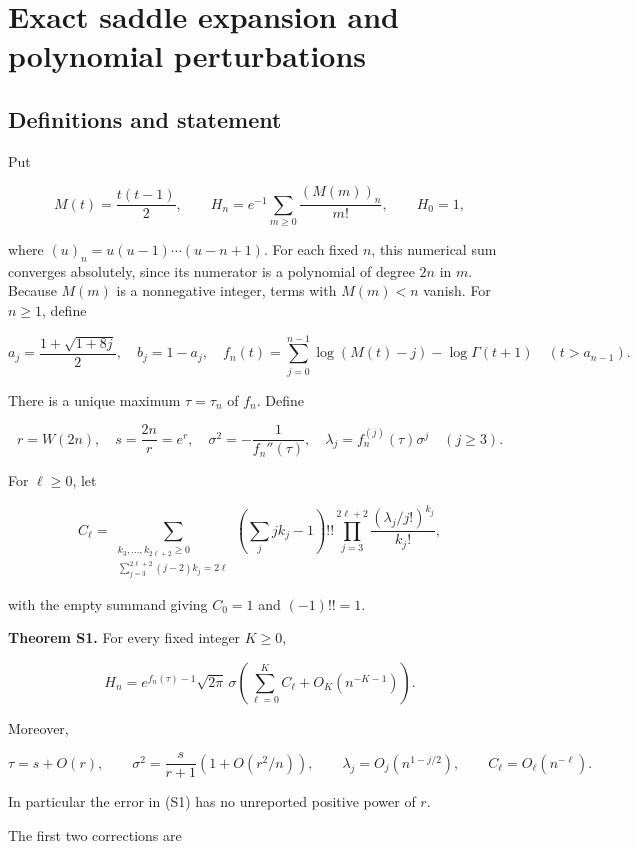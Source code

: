 \section{Exact saddle expansion and polynomial
perturbations}\label{tcl:exact-saddle-expansion-and-polynomial-perturbations}

\subsection{Definitions and statement}\label{tcl:definitions-and-statement}

Put

\[
 M(t)=\frac{t(t-1)}2,\qquad
 H_n=e^{-1}\sum_{m\ge0}\frac{(M(m))_n}{m!},\qquad H_0=1,
\]

where \((u)_n=u(u-1)\cdots(u-n+1)\). For each fixed \(n\), this
numerical sum converges absolutely, since its numerator is a polynomial
of degree \(2n\) in \(m\). Because \(M(m)\) is a nonnegative integer,
terms with \(M(m)<n\) vanish. For \(n\ge1\), define

\[
 a_j=\frac{1+\sqrt{1+8j}}2,\quad b_j=1-a_j,
 \quad f_n(t)=\sum_{j=0}^{n-1}\log(M(t)-j)-\log\Gamma(t+1)
 \quad(t>a_{n-1}).
\]

There is a unique maximum \(\tau=\tau_n\) of \(f_n\). Define

\[
 r=W(2n),\quad s=\frac{2n}{r}=e^r,\quad
 \sigma^2=-\frac1{f_n''(\tau)},\quad
 \lambda_j=f_n^{(j)}(\tau)\sigma^j\quad(j\ge3).
\]

For \(\ell\ge0\), let

\[
 C_\ell=\sum_{\substack{k_3,\ldots,k_{2\ell+2}\ge0\\
               \sum_{j=3}^{2\ell+2}(j-2)k_j=2\ell}}
 \left(\sum_j jk_j-1\right)!!
 \prod_{j=3}^{2\ell+2}\frac{(\lambda_j/j!)^{k_j}}{k_j!},
\]

with the empty summand giving \(C_0=1\) and \((-1)!!=1\).

\textbf{Theorem S1.} For every fixed integer \(K\ge0\),

\[
 H_n=e^{f_n(\tau)-1}\sqrt{2\pi}\,\sigma
       \left(\sum_{\ell=0}^K C_\ell+O_K(n^{-K-1})\right).
 \tag{S1}
\]

Moreover,

\[
 \tau=s+O(r),\qquad
 \sigma^2=\frac{s}{r+1}\left(1+O(r^2/n)\right),\qquad
 \lambda_j=O_j(n^{1-j/2}),\qquad C_\ell=O_\ell(n^{-\ell}).
 \tag{S2}
\]

In particular the error in (S1) has no unreported positive power of
\(r\).

The first two corrections are

